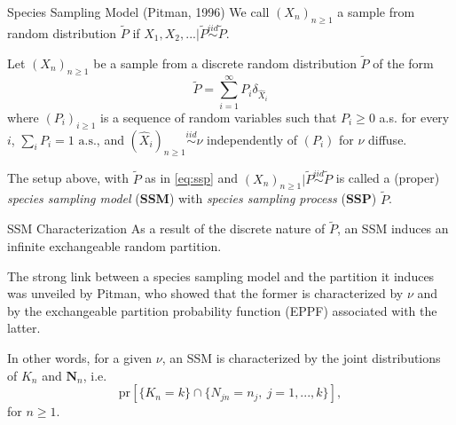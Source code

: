 \documentclass[11pt, handout]{beamer}
\begin{document}
\begin{frame}{Species Sampling Model (Pitman, 1996)}
    We call \((X_n)_{n \geq 1}\) a sample from random distribution \(\tilde{P}\) if \(X_1,X_2,... | \tilde{P} \overset{iid}{\sim} \tilde{P}\).
    \begin{definition}
        \label{th:ssm}
        Let \((X_n)_{n \geq 1}\) be a sample from a discrete random distribution \(\tilde{P}\) of the form
        \begin{equation}
            \label{eq:ssp}
            \tilde{P} = \sum_{i = 1}^{\infty} P_{i} \delta_{\hat{X}_i}
        \end{equation}
        where \((P_i)_{i \geq 1}\) is a sequence of random variables such that \(P_i \geq 0\) a.s. for every \(i\), \(\sum_i P_i = 1 \text{ a.s.}\), and \((\hat{X}_i)_{n \geq 1} \overset{iid}{\sim} \nu\) independently of \((P_i)\) for \(\nu\) diffuse.
    \end{definition}
    \medskip
    \pause
    The setup above, with \(\tilde{P}\) as in \eqref{eq:ssp} and \((X_n)_{n \geq 1} | \tilde{P} \overset{iid}{\sim} \tilde{P}\) is called a (proper) \textit{species sampling model} (\textbf{SSM}) with \textit{species sampling process} (\textbf{SSP}) \(\tilde{P}\).
\end{frame}

\begin{frame}{SSM Characterization}
    As a result of the discrete nature of \(\tilde{P}\), an SSM induces an infinite exchangeable random partition.
    \medskip
    
    The strong link between a species sampling model and the partition it induces was unveiled by Pitman, who showed that the former is characterized by \(\nu\) and by the exchangeable partition probability function (EPPF) associated with the latter. 
    \medskip
    
    In other words, for a given \(\nu\), an SSM is characterized by the joint distributions of \(K_n\) and \(\mathbf{N}_n\), i.e.
    \begin{equation*}
        \text{pr}[\{K_n = k\} \cap \{N_{jn} = n_j,\ j = 1,...,k\}],
    \end{equation*}
    for \(n \geq 1\).
\end{frame}
\end{document}
